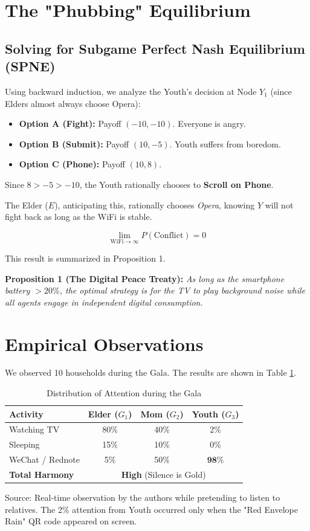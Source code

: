 \documentclass[AER]{AEA}
\begin{document}
\section{The "Phubbing" Equilibrium}

\subsection{Solving for Subgame Perfect Nash Equilibrium (SPNE)}
Using backward induction, we analyze the Youth's decision at Node $Y_1$ (since Elders almost always choose Opera):
\begin{itemize}
    \item \textbf{Option A (Fight):} Payoff $(-10, -10)$. Everyone is angry.
    \item \textbf{Option B (Submit):} Payoff $(10, -5)$. Youth suffers from boredom.
    \item \textbf{Option C (Phone):} Payoff $(10, 8)$.
\end{itemize}
Since $8 > -5 > -10$, the Youth rationally chooses to \textbf{Scroll on Phone}.

The Elder ($E$), anticipating this, rationally chooses \textit{Opera}, knowing $Y$ will not fight back as long as the WiFi is stable.

\begin{equation}
    \lim_{\text{WiFi} \to \infty} P(\text{Conflict}) = 0
\end{equation}

This result is summarized in Proposition 1.

\textbf{Proposition 1 (The Digital Peace Treaty):} \textit{As long as the smartphone battery $> 20\%$, the optimal strategy is for the TV to play background noise while all agents engage in independent digital consumption.}

\section{Empirical Observations}

We observed 10 households during the Gala. The results are shown in Table \ref{tab:gala}.

\begin{table}[ht]
\caption{Distribution of Attention during the Gala}
\label{tab:gala}
\centering
\begin{tabular}{lccc}
\toprule
Activity & Elder ($G_1$) & Mom ($G_2$) & Youth ($G_3$) \\
\midrule
Watching TV & 80\% & 40\% & 2\% \\
Sleeping & 15\% & 10\% & 0\% \\
WeChat / Rednote & 5\% & 50\% & $\mathbf{98\%}$ \\
\midrule
\textbf{Total Harmony} & \multicolumn{3}{c}{\textbf{High} (Silence is Gold)} \\
\bottomrule
\end{tabular}
\begin{tablenotes}
Source: Real-time observation by the authors while pretending to listen to relatives. The 2\% attention from Youth occurred only when the "Red Envelope Rain" QR code appeared on screen.
\end{tablenotes}
\end{table}
\end{document}
